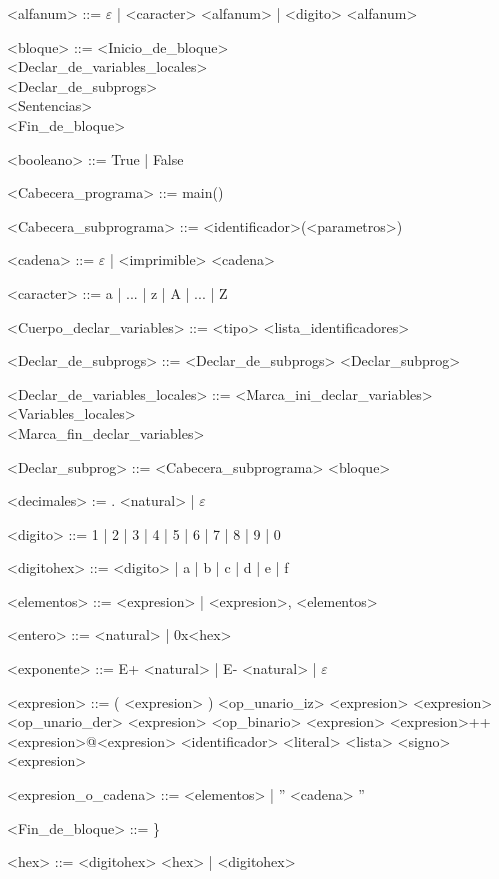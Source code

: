 \documentclass{scrartcl}
\begin{document}
\setlength{\grammarparsep}{4pt plus 1pt minus 1pt}
\begin{grammar}

<alfanum> ::= $\varepsilon$ | <caracter> <alfanum> | <digito> <alfanum>

<bloque> ::= <Inicio_de_bloque> \\
 <Declar_de_variables_locales> \\
 <Declar_de_subprogs> \\
 <Sentencias> \\
 <Fin_de_bloque>

<booleano> ::= True | False

<Cabecera_programa> ::= main()

<Cabecera_subprograma> ::= <identificador>(<parametros>)

<cadena> ::= $\varepsilon$ | <imprimible> <cadena>

<caracter> ::= a | ... | z | A | ... | Z

<Cuerpo_declar_variables> ::= <tipo> <lista_identificadores>

<Declar_de_subprogs> ::= <Declar_de_subprogs> <Declar_subprog>

<Declar_de_variables_locales> ::= <Marca_ini_declar_variables> \\
<Variables_locales> \\
<Marca_fin_declar_variables>

<Declar_subprog> ::= <Cabecera_subprograma> <bloque>

<decimales> := . <natural> | $\varepsilon$

<digito> ::= 1 | 2 | 3 | 4 | 5 | 6 | 7 | 8 | 9 | 0

<digitohex> ::= <digito> | a | b | c | d | e | f

<elementos> ::= <expresion> | <expresion>, <elementos>

<entero> ::= <natural> | 0x<hex>

<exponente> ::= E+ <natural> | E- <natural> | $\varepsilon$

<expresion> ::= ( <expresion> )
\alt <op_unario_iz> <expresion>
\alt <expresion> <op_unario_der>
\alt <expresion> <op_binario> <expresion>
\alt <expresion>++<expresion>@<expresion>
\alt <identificador>
\alt <literal>
\alt <lista>
\alt <signo> <expresion>

<expresion_o_cadena> ::= <elementos> | '' <cadena> ''

<Fin_de_bloque> ::= \}

<hex> ::= <digitohex> <hex> | <digitohex>


\end{grammar}
\end{document}
